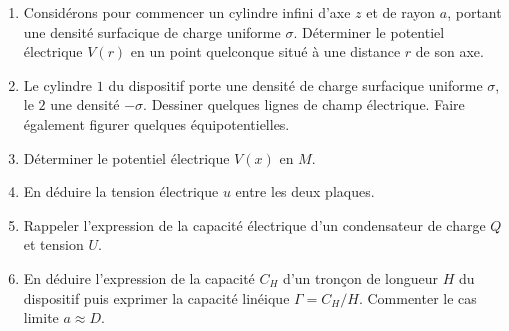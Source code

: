 \documentclass[a4paper,12pt,french]{article}
\begin{document}
\begin{enumerate}
	\item Considérons pour commencer un cylindre infini d'axe $z$ et de rayon $a$, portant une densité surfacique de charge uniforme $\sigma$. Déterminer le potentiel électrique $V(r)$ en un point quelconque situé à une distance $r$ de son axe.
	\item Le cylindre $1$ du dispositif porte une densité de charge surfacique uniforme $\sigma$, le $2$ une densité $-\sigma$. Dessiner quelques lignes de champ électrique. Faire également figurer quelques équipotentielles.
	\item Déterminer le potentiel électrique $V(x)$ en $M$.
	\item En déduire la tension électrique $u$ entre les deux plaques.
	\item Rappeler l'expression de la capacité électrique d'un condensateur de charge $Q$ et tension $U$.
	\item En déduire l'expression de la capacité $C_H$ d'un tronçon de longueur $H$ du dispositif puis exprimer la capacité linéique $\Gamma = C_H/H$. Commenter le cas limite $a \approx D$.
\end{enumerate}

\newpage
\end{document}
